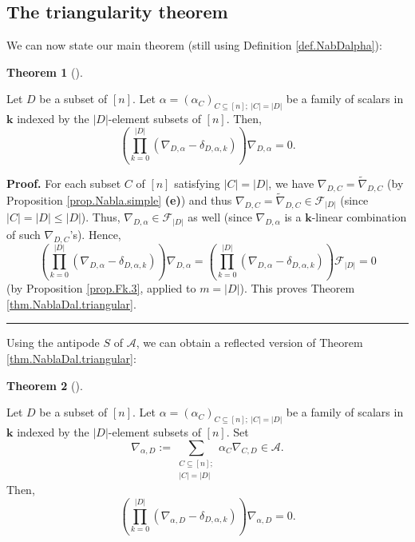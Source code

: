 \documentclass[numbers=enddot,12pt,final,onecolumn,notitlepage]{scrartcl}%
\numberwithin{exer}{subsection}
\theoremstyle{definition}
\newtheorem{theo}{Theorem}[subsection]
\newenvironment{theorem}[1][]
{\begin{theo}[#1]\begin{leftbar}}
{\end{leftbar}\end{theo}}
\newenvironment{proof}[1][Proof]{\noindent\textbf{#1.} }{\ \rule{0.5em}{0.5em}}
\let\sumnonlimits\sum
\let\prodnonlimits\prod
\renewcommand{\sum}{\sumnonlimits\limits}
\renewcommand{\prod}{\prodnonlimits\limits}
\begin{document}
\subsection{The triangularity theorem}

We can now state our main theorem (still using Definition \ref{def.NabDalpha}):

\begin{theorem}
\label{thm.NablaDal.triangular}Let $D$ be a subset of $\left[  n\right]  $.
Let $\alpha=\left(  \alpha_{C}\right)  _{C\subseteq\left[  n\right]
;\ \left\vert C\right\vert =\left\vert D\right\vert }$ be a family of scalars
in $\mathbf{k}$ indexed by the $\left\vert D\right\vert $-element subsets of
$\left[  n\right]  $. Then,%
\[
\left(  \prod_{k=0}^{\left\vert D\right\vert }\left(  \nabla_{D,\alpha}%
-\delta_{D,\alpha,k}\right)  \right)  \nabla_{D,\alpha}=0.
\]

\end{theorem}

\begin{proof}
For each subset $C$ of $\left[  n\right]  $ satisfying $\left\vert
C\right\vert =\left\vert D\right\vert $, we have $\nabla_{D,C}%
=\widetilde{\nabla}_{D,C}$ (by Proposition \ref{prop.Nabla.simple}
\textbf{(e)}) and thus $\nabla_{D,C}=\widetilde{\nabla}_{D,C}\in
\mathcal{F}_{\left\vert D\right\vert }$ (since $\left\vert C\right\vert
=\left\vert D\right\vert \leq\left\vert D\right\vert $). Thus, $\nabla
_{D,\alpha}\in\mathcal{F}_{\left\vert D\right\vert }$ as well (since
$\nabla_{D,\alpha}$ is a $\mathbf{k}$-linear combination of such $\nabla
_{D,C}$'s). Hence,%
\[
\left(  \prod_{k=0}^{\left\vert D\right\vert }\left(  \nabla_{D,\alpha}%
-\delta_{D,\alpha,k}\right)  \right)  \nabla_{D,\alpha}=\left(  \prod
_{k=0}^{\left\vert D\right\vert }\left(  \nabla_{D,\alpha}-\delta_{D,\alpha
,k}\right)  \right)  \mathcal{F}_{\left\vert D\right\vert }=0
\]
(by Proposition \ref{prop.Fk.3}, applied to $m=\left\vert D\right\vert $).
This proves Theorem \ref{thm.NablaDal.triangular}.
\end{proof}

Using the antipode $S$ of $\mathcal{A}$, we can obtain a reflected version of
Theorem \ref{thm.NablaDal.triangular}:

\begin{theorem}
\label{thm.NablaDal.triangular2}Let $D$ be a subset of $\left[  n\right]  $.
Let $\alpha=\left(  \alpha_{C}\right)  _{C\subseteq\left[  n\right]
;\ \left\vert C\right\vert =\left\vert D\right\vert }$ be a family of scalars
in $\mathbf{k}$ indexed by the $\left\vert D\right\vert $-element subsets of
$\left[  n\right]  $. Set
\[
\nabla_{\alpha,D}:=\sum_{\substack{C\subseteq\left[  n\right]  ;\\\left\vert
C\right\vert =\left\vert D\right\vert }}\alpha_{C}\nabla_{C,D}\in\mathcal{A}.
\]
Then,%
\[
\left(  \prod_{k=0}^{\left\vert D\right\vert }\left(  \nabla_{\alpha,D}%
-\delta_{D,\alpha,k}\right)  \right)  \nabla_{\alpha,D}=0.
\]

\end{theorem}
\end{document}
